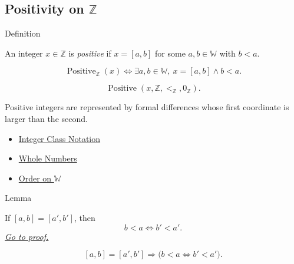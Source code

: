 \subsection*{\texorpdfstring{Positivity on $\mathbb{Z}$}{Positivity on Z}}

\begin{definitionbox}{Definition}
\begin{definition}
\label{def:positive-integer}
An integer $x\in\mathbb{Z}$ is \emph{positive} if $x=[a,b]$ for some
$a,b\in\mathbb{W}$ with $b<a$.
\end{definition}
\end{definitionbox}

\begin{remark*}
\[
\operatorname{Positive}_{\mathbb{Z}}(x)
\Longleftrightarrow
\exists a,b\in\mathbb{W},\ x=[a,b]\land b<a.
\]
\end{remark*}

\begin{remark*}
\[
\operatorname{Positive}(x,\mathbb{Z},<_{\mathbb{Z}},0_{\mathbb{Z}}).
\]
\end{remark*}

\begin{remark*}[Interpretation]
Positive integers are represented by formal differences whose first coordinate
is larger than the second.
\end{remark*}

\begin{dependencies}
\begin{itemize}
  \item \hyperref[def:integer-class-notation]{Integer Class Notation}
  \item \hyperref[def:whole-numbers]{Whole Numbers}
  \item \hyperref[def:order-on-w]{Order on $\mathbb{W}$}
\end{itemize}
\end{dependencies}

\begin{lemmabox}{Lemma}
\begin{lemma}
\label{lem:positivity-respects-equivalence}
If $[a,b]=[a',b']$, then
\[
b<a \Longleftrightarrow b'<a'.
\]
\hyperref[prf:positivity-respects-equivalence]{\textit{Go to proof.}}
\end{lemma}
\end{lemmabox}

\begin{remark*}
\[
[a,b]=[a',b']
\Longrightarrow
\bigl(b<a \Longleftrightarrow b'<a'\bigr).
\]
\end{remark*}

